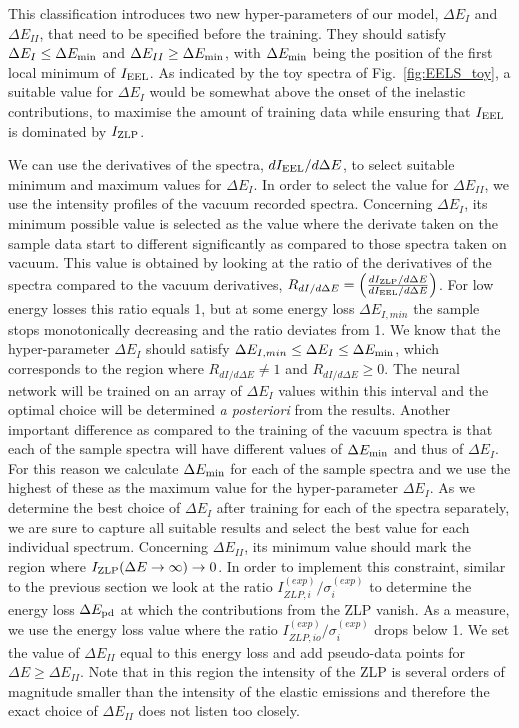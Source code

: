 This classification introduces two new hyper-parameters of our model, $\Delta E_I$ and
$\Delta E_{II}$, that need to be specified before the training.
%
They should satisfy $\Delta E_I \le \Delta E_{\rm min}$ and $\Delta E_{II} \ge \Delta E_{\rm min}$,
with $\Delta E_{\rm min}$ being the position of the first local minimum of $I_{\rm EEL}$.
%
As indicated by the toy spectra of Fig.~\ref{fig:EELS_toy}, a suitable value for $\Delta E_{I}$
would be somewhat above the onset of the inelastic contributions, to maximise
the amount of training data while ensuring that $I_{\rm EEL}$ is dominated
by $I_{\rm ZLP}$.

We can use the derivatives of the spectra, $dI_{\rm EEL}/d\Delta E$, to select suitable minimum and
maximum values for $\Delta E_I$. In order to select the value for $\Delta E_{II}$, we use the intensity
profiles of the vacuum recorded spectra. 
%
Concerning $\Delta E_I $, its minimum possible value is selected as the value where the derivate taken on the sample
data start to different significantly as compared to those spectra taken on vacuum.
%
This value is obtained by looking at the ratio of the derivatives of the spectra compared to the vacuum derivatives,
$R_{dI/d \Delta E} =  \left( \frac{dI_{\rm ZLP}/d\Delta E}{dI_{\rm EEL}/d\Delta E}\right)$. 
%
For low energy losses this ratio equals 1, but at some energy loss $\Delta E_{I,min}$ the
sample stops monotonically decreasing and the ratio deviates from 1. 
%
We know that the hyper-parameter $\Delta E_I$ should satisfy $\Delta E_{I,min} \le \Delta E_I \le \Delta E_{\rm min}$,
which corresponds to the region where $R_{dI/d \Delta E} \ne  1$ and $R_{dI/d \Delta E} \ge 0$.
%
The neural network will be trained on an array of $\Delta E_I$ values within this interval and 
the optimal choice will be determined {\it a posteriori} from the results.
%
Another important difference as compared to the training of the vacuum spectra is that each of the sample
spectra will have different values of $\Delta E_{\rm min}$ and thus of $\Delta E_I$. 
%
For this reason we calculate $\Delta E_{\rm min}$  for each of the sample spectra and we use the highest of these
as the maximum value for the hyper-parameter $\Delta E_I$. 
%
As we determine the best choice of $\Delta E_I$ after training for each of the spectra separately, 
we are sure to capture all suitable results and select the best value for each individual spectrum. 
%
Concerning $\Delta E_{II}$, its minimum value should mark the region where $I_{\rm ZLP}(\Delta E\to \infty)\to 0$. 
%
In order to implement this constraint, similar to the previous section we look at the ratio 
$I_{ZLP,i}^{(exp)}/ \sigma_i^{(exp)}$ to determine the energy loss $\Delta E_{\rm pd}$ at 
which the contributions from the ZLP vanish. 
%
As a measure, we use the energy loss value where the ratio $I_{ZLP,io}^{(exp)}/\sigma_i^{(exp)}$ drops below 1. 
%
We set the value of $\Delta E_{II}$ equal to this energy loss and add pseudo-data points for $\Delta E \ge \Delta E_{II}$.
%
Note that in this region the intensity of the ZLP is several orders of magnitude smaller than the intensity 
of the elastic emissions and therefore the exact choice of $\Delta E_{II}$ does not listen too closely.
